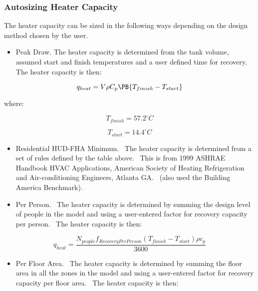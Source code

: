 \subsubsection{Autosizing Heater Capacity}\label{autosizing-heater-capacity}

The heater capacity can be sized in the following ways depending on the design method chosen by the user.

\begin{itemize}
  \item Peak Draw. The heater capacity is determined from the tank volume, assumed start and finish temperatures and a user defined time for recovery.~ The heater capacity is then:
\end{itemize}

\begin{equation}
  q_{heat} = V\rho C_p \PB{T_{finish} - T_{start}}
\end{equation}

where:

\begin{equation}
{T_{finish}} = 57.2^{\circ}C
\end{equation}

\begin{equation}
{T_{start}} = 14.4^{\circ}C
\end{equation}

\begin{itemize}
\item Residential HUD-FHA Minimum.~ The heater capacity is determined from a set of rules defined by the table above.~ This is from 1999 ASHRAE Handbook HVAC Applications, American Society of Heating Refrigeration and Air-conditioning Engineers, Atlanta GA.~ (also used the Building America Benchmark).
\item Per Person.~ The heater capacity is determined by summing the design level of people in the model and using a user-entered factor for recovery capacity per person.~ The heater capacity is then:
\end{itemize}

\begin{equation}
{q_{heat}} = \frac{{{N_{people}}{f_{RecoveryPerPerson}}({T_{finish}} - {T_{start}}) \rho {c_p}}}{{3600}}
\end{equation}

\begin{itemize}
\item Per Floor Area.~ The heater capacity is determined by summing the floor area in all the zones in the model and using a user-entered factor for recovery capacity per floor area.~ The heater capacity is then:
\end{itemize}

